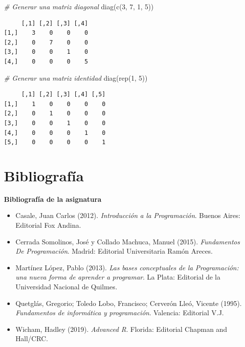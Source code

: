 \documentclass[
]{book}
\newenvironment{Shaded}{\begin{snugshade}}{\end{snugshade}}
\newcommand{\CommentTok}[1]{\textcolor[rgb]{0.56,0.35,0.01}{\textit{#1}}}
\newcommand{\DecValTok}[1]{\textcolor[rgb]{0.00,0.00,0.81}{#1}}
\newcommand{\FunctionTok}[1]{\textcolor[rgb]{0.00,0.00,0.00}{#1}}
\newcommand{\NormalTok}[1]{#1}
\providecommand{\tightlist}{%
  \setlength{\itemsep}{0pt}\setlength{\parskip}{0pt}}
\begin{document}
\begin{Shaded}
\begin{Highlighting}[]
\CommentTok{\# Generar una matriz diagonal}
\FunctionTok{diag}\NormalTok{(}\FunctionTok{c}\NormalTok{(}\DecValTok{3}\NormalTok{, }\DecValTok{7}\NormalTok{, }\DecValTok{1}\NormalTok{, }\DecValTok{5}\NormalTok{))}
\end{Highlighting}
\end{Shaded}

\begin{verbatim}
     [,1] [,2] [,3] [,4]
[1,]    3    0    0    0
[2,]    0    7    0    0
[3,]    0    0    1    0
[4,]    0    0    0    5
\end{verbatim}

\begin{Shaded}
\begin{Highlighting}[]
\CommentTok{\# Generar una matriz identidad}
\FunctionTok{diag}\NormalTok{(}\FunctionTok{rep}\NormalTok{(}\DecValTok{1}\NormalTok{, }\DecValTok{5}\NormalTok{))}
\end{Highlighting}
\end{Shaded}

\begin{verbatim}
     [,1] [,2] [,3] [,4] [,5]
[1,]    1    0    0    0    0
[2,]    0    1    0    0    0
[3,]    0    0    1    0    0
[4,]    0    0    0    1    0
[5,]    0    0    0    0    1
\end{verbatim}

\hypertarget{bibliografuxeda}{%
\chapter*{Bibliografía}\label{bibliografuxeda}}

\textbf{Bibliografía de la asignatura}

\begin{itemize}
\tightlist
\item
  Casale, Juan Carlos (2012). \emph{Introducción a la Programación}. Buenos Aires: Editorial Fox Andina.
\item
  Cerrada Somolinos, José y Collado Machuca, Manuel (2015). \emph{Fundamentos De Programación}. Madrid: Editorial Universitaria Ramón Areces.
\item
  Martínez López, Pablo (2013). \emph{Las bases conceptuales de la Programación: una nueva forma de aprender a programar}. La Plata: Editorial de la Universidad Nacional de Quilmes.
\item
  Quetglás, Gregorio; Toledo Lobo, Francisco; Cerverón Lleó, Vicente (1995). \emph{Fundamentos de informática y programación}. Valencia: Editorial V.J.
\item
  Wicham, Hadley (2019). \emph{Advanced R}. Florida: Editorial Chapman and Hall/CRC.
\end{itemize}
\end{document}

